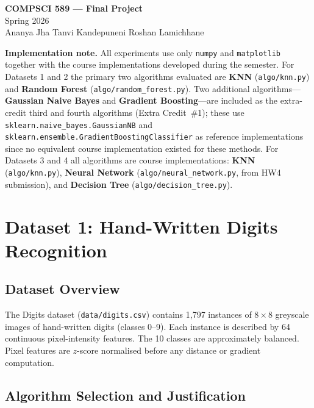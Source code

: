 \documentclass[11pt,letterpaper]{article}
\begin{document}
\begin{center}
  {\LARGE \textbf{COMPSCI 589 --- Final Project}}\\[6pt]
  {\large Spring 2026}\\[4pt]
  Ananya Jha \quad Tanvi Kandepuneni \quad Roshan Lamichhane
\end{center}

\vspace{6pt}
\noindent\textbf{Implementation note.}
All experiments use only \texttt{numpy} and \texttt{matplotlib} together
with the course implementations developed during the semester.
For Datasets 1 and 2 the primary two algorithms evaluated are
\textbf{KNN} (\texttt{algo/knn.py}) and \textbf{Random Forest}
(\texttt{algo/random\_forest.py}).
Two additional algorithms---\textbf{Gaussian Naive Bayes} and
\textbf{Gradient Boosting}---are included as the extra-credit third and
fourth algorithms (Extra Credit~\#1); these use
\texttt{sklearn.naive\_bayes.GaussianNB} and
\texttt{sklearn.ensemble.GradientBoostingClassifier}
as reference implementations since no equivalent course implementation
existed for these methods.
For Datasets 3 and 4 all algorithms are course implementations:
\textbf{KNN} (\texttt{algo/knn.py}),
\textbf{Neural Network} (\texttt{algo/neural\_network.py}, from
HW4 submission), and
\textbf{Decision Tree} (\texttt{algo/decision\_tree.py}).

\tableofcontents
\newpage

\section{Dataset 1: Hand-Written Digits Recognition}

\subsection{Dataset Overview}

The Digits dataset (\texttt{data/digits.csv}) contains 1,797 instances of
$8\times8$ greyscale images of hand-written digits (classes 0--9).  Each
instance is described by 64 continuous pixel-intensity features.  The 10
classes are approximately balanced.  Pixel features are $z$-score normalised
before any distance or gradient computation.

\subsection{Algorithm Selection and Justification}
\end{document}
